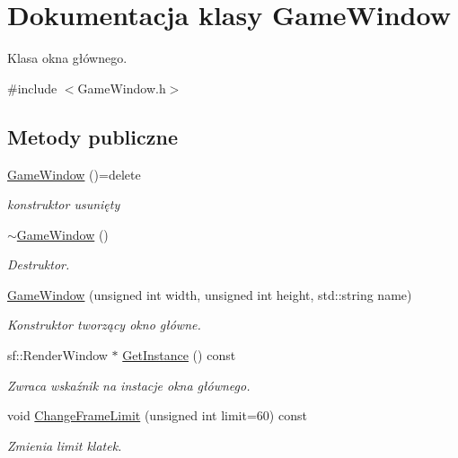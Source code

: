 \hypertarget{class_game_window}{}\section{Dokumentacja klasy Game\+Window}
\label{class_game_window}


Klasa okna głównego.  




{\ttfamily \#include $<$Game\+Window.\+h$>$}

\subsection*{Metody publiczne}
\begin{DoxyCompactItemize}
\item 
\mbox{\hyperlink{class_game_window_aeb8fe4d63cdd9e9d3e6fdcb35d15a37c}{Game\+Window}} ()=delete
\begin{DoxyCompactList}\small\item\em konstruktor usunięty \end{DoxyCompactList}\item 
\mbox{\hyperlink{class_game_window_a55b071c0390e45c064a160c1e6baaa08}{$\sim$\+Game\+Window}} ()
\begin{DoxyCompactList}\small\item\em Destruktor. \end{DoxyCompactList}\item 
\mbox{\hyperlink{class_game_window_a22da49d930c2fd26888b223049a9da18}{Game\+Window}} (unsigned int width, unsigned int height, std\+::string name)
\begin{DoxyCompactList}\small\item\em Konstruktor tworzący okno główne. \end{DoxyCompactList}\item 
sf\+::\+Render\+Window $\ast$ \mbox{\hyperlink{class_game_window_aa5ef8ededf54c333a5b19344b95220de}{Get\+Instance}} () const
\begin{DoxyCompactList}\small\item\em Zwraca wskaźnik na instacje okna głównego. \end{DoxyCompactList}\item 
void \mbox{\hyperlink{class_game_window_af2b8df98b008a25d8c64f67cd6f23f59}{Change\+Frame\+Limit}} (unsigned int limit=60) const
\begin{DoxyCompactList}\small\item\em Zmienia limit klatek. \end{DoxyCompactList}\item 

\end{DoxyCompactItemize}
